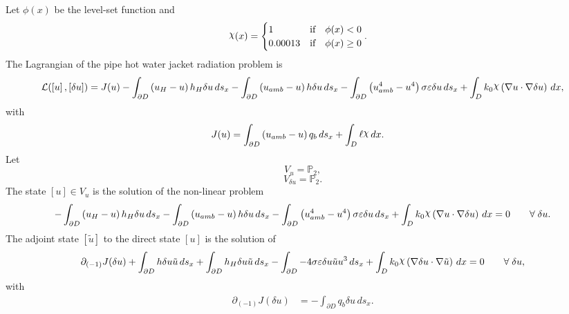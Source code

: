 \documentclass[preview]{standalone}
\let\oldcdot\cdot
\let\cdot\oldcdot
\begin{document}
Let $\phi(x)$ be the level-set function and
 \begin{align*}\raisebox{\depth}{$\chi$}(x) &= \begin{cases} 1 & \mbox{if}\quad \phi(x) < 0 \\ 0.00013 & \mbox{if}\quad \phi(x)  \ge 0 \end{cases}.\end{align*}
The Lagrangian of the pipe hot water jacket radiation problem is
\begin{dmath*}
\mathcal L(\left[ u\right],\left[ \delta u\right]) = J(u) -  \int_{\partial D} \left(u_{H} - u\right) h_{H} \delta u \,ds_x -  \int_{\partial D} \left(u_{amb} - u\right) h \delta u \,ds_x -  \int_{\partial D} \left(u_{amb}^{4} - u^{4}\right) \sigma \varepsilon \delta u \,ds_x +  \int_{D} k_{0} \raisebox{\depth}{$\chi$} \left(  \nabla u  \cdot  \nabla \delta u  \right) \,dx , 
\end{dmath*}
with 
\begin{align*}
J(u) &=  \int_{\partial D} \left(u_{amb} - u\right) q_{b} \,ds_x +  \int_{D} \ell \raisebox{\depth}{$\chi$} \,dx.
 \end{align*}
Let
\begin{equation*}
V_{u} = \mathbb P_{2},\end{equation*}
\begin{equation*}
V_{\delta u} = \mathbb P_{2}.\end{equation*}
The state $\left[ u\right] \in  V_{u}$ is the solution of the non-linear problem
\begin{dmath*}
-  \int_{\partial D} \left(u_{H} - u\right) h_{H} \delta u \,ds_x -  \int_{\partial D} \left(u_{amb} - u\right) h \delta u \,ds_x -  \int_{\partial D} \left(u_{amb}^{4} - u^{4}\right) \sigma \varepsilon \delta u \,ds_x +  \int_{D} k_{0} \raisebox{\depth}{$\chi$} \left(  \nabla u  \cdot  \nabla \delta u  \right) \,dx = 0\qquad \forall\; \delta u . 
\end{dmath*}
The adjoint state $\left[ \tilde u\right]$ to the direct state $\left[ u\right]$ is the solution of
\begin{dmath*}
\partial_{(-1)} J(\delta u) +  \int_{\partial D} h \delta u \tilde u \,ds_x +  \int_{\partial D} h_{H} \delta u \tilde u \,ds_x -  \int_{\partial D} - 4 \sigma \varepsilon \delta u \tilde u u^{3} \,ds_x +  \int_{D} k_{0} \raisebox{\depth}{$\chi$} \left(  \nabla \delta u  \cdot  \nabla \tilde u  \right) \,dx = 0\qquad \forall\; \delta u , 
\end{dmath*}
with 
\begin{align*}
\partial_{(-1)} J(\delta u) &= -  \int_{\partial D} q_{b} \delta u \,ds_x.
 \end{align*}
\end{document}

